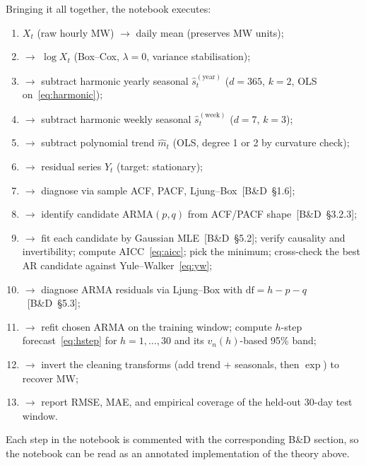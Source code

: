 \documentclass[11pt,a4paper]{article}
\newcommand{\BD}[1]{\textsc{[B\&D~§#1]}}
\begin{document}
Bringing it all together, the notebook executes:
\begin{enumerate}[leftmargin=1.5em,itemsep=2pt]
\item $X_t$ (raw hourly MW) $\to$ daily mean (preserves MW units);
\item $\to$ $\log X_t$ (Box--Cox, $\lambda = 0$, variance stabilisation);
\item $\to$ subtract harmonic yearly seasonal $\hat s_t^{(\text{year})}$
      ($d=365$, $k=2$, OLS on~\eqref{eq:harmonic});
\item $\to$ subtract harmonic weekly seasonal $\hat s_t^{(\text{week})}$
      ($d=7$, $k=3$);
\item $\to$ subtract polynomial trend $\hat m_t$ (OLS, degree 1 or 2 by
      curvature check);
\item $\to$ residual series $\hat Y_t$ (target: stationary);
\item $\to$ diagnose via sample ACF, PACF, Ljung--Box~\BD{1.6};
\item $\to$ identify candidate ARMA$(p, q)$ from ACF/PACF shape~\BD{3.2.3};
\item $\to$ fit each candidate by Gaussian MLE~\BD{5.2}; verify causality and
      invertibility; compute AICC~\eqref{eq:aicc}; pick the minimum;
      cross-check the best AR candidate against Yule--Walker~\eqref{eq:yw};
\item $\to$ diagnose ARMA residuals via Ljung--Box with
      $\text{df} = h - p - q$~\BD{5.3};
\item $\to$ refit chosen ARMA on the training window; compute $h$-step
      forecast~\eqref{eq:hstep} for $h = 1, \ldots, 30$ and its
      $v_n(h)$-based 95\% band;
\item $\to$ invert the cleaning transforms (add trend + seasonals, then
      $\exp$) to recover MW;
\item $\to$ report RMSE, MAE, and empirical coverage of the held-out 30-day
      test window.
\end{enumerate}

\noindent Each step in the notebook is commented with the corresponding B\&D
section, so the notebook can be read as an annotated implementation of the
theory above.
\end{document}
